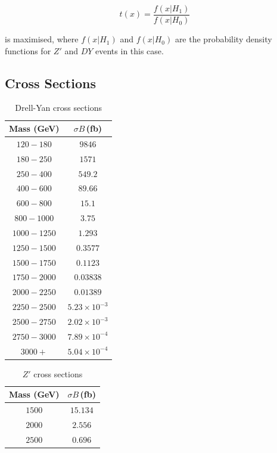 \documentclass{article}
\begin{document}
\begin{equation}
t(x) = \frac{f(x|H_1)}{f(x|H_0)}
\end{equation}

is maximised, where $f(x|H_1)$ and $f(x|H_0)$ are the probability density functions for $Z'$ and $DY$ events in this case.

\subsection{Cross Sections}

\begin{table}[h!t]
\label{table:DYXS}
\centering
\caption{ Drell-Yan cross sections }
\begin{tabular}{ |c|c| } 
\hline
Mass (GeV) & $\sigma B\,$(fb)\\\hline
$120-180$ & $9846$ \\\hline
$180-250$ & $1571$\\\hline
$250-400$ & $549.2$\\\hline
$400-600$ & $89.66$\\\hline
$600-800$ & $15.1$\\\hline
$800-1000$ & $3.75$\\\hline
$1000-1250$ & $1.293$\\\hline
$1250-1500$ & $0.3577$\\\hline
$1500-1750$ & $0.1123$\\\hline
$1750-2000$ & $0.03838$\\\hline
$2000-2250$ & $0.01389$\\\hline
$2250-2500$ & $5.23\times10^{-3}$\\\hline
$2500-2750$ & $2.02\times10^{-3}$\\\hline
$2750-3000$ & $7.89\times10^{-4}$\\\hline
$3000+$ & $5.04\times10^{-4}$\\\hline
\end{tabular}
\end{table}

\begin{table}[h!t]
\label{table:ZPrimeXS}
\centering
\caption{ $Z'$ cross sections }
\begin{tabular}{ |c|c| } 
\hline
Mass (GeV) & $\sigma B\,$(fb) \\\hline
$1500$ & $15.134$ \\\hline
$2000$ & $2.556$ \\\hline 
$2500$ & $0.696$ \\\hline
\end{tabular}
\end{table}
\end{document}
